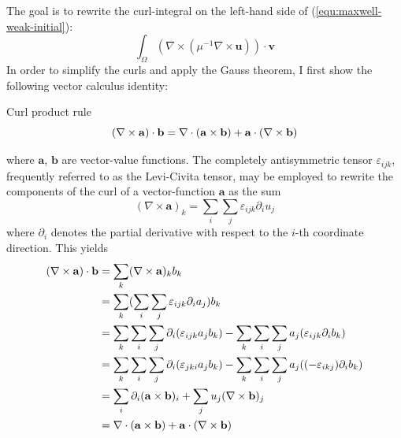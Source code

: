 \documentclass[11pt, a4paper]{article}
\begin{document}
The goal is to rewrite the curl-integral on the left-hand side of 
(\ref{equ:maxwell-weak-initial}):
\begin{equation}
    \int_{\Omega} (\nabla \times (\mu^{-1} \nabla \times \mathbf{u})) \cdot \mathbf{v} \label{equ:maxwell-weak-initial-LHS}
\end{equation}
In order to simplify the curls and apply the Gauss theorem, I first show
the following vector calculus identity:
\begin{fancybox}{Curl product rule}
    \begin{equation}
        (\nabla \times \mathbf{a}) \cdot \mathbf{b} = \nabla \cdot (\mathbf{a} \times \mathbf{b}) + \mathbf{a} \cdot (\nabla \times \mathbf{b}) \label{equ:vector-calculus} \\
    \end{equation}
\end{fancybox}
where $\mathbf{a}$, $\mathbf{b}$ are vector-value functions. The completely
antisymmetric tensor $\varepsilon_{ijk}$, frequently referred to as the
Levi-Civita tensor, may be employed to rewrite the components of the
curl of a vector-function $\mathbf{a}$ as the sum
\begin{equation}
    (\nabla \times \mathbf{a})_k = \sum_i \sum_j \varepsilon_{ijk} \partial_i u_j
\end{equation}
where $\partial_i$ denotes the partial derivative with respect to the $i$-th coordinate
direction. This yields
\begin{align}
    (\nabla \times \mathbf{a}) \cdot \mathbf{b} &= \sum_k (\nabla \times \mathbf{a})_k b_k \notag \\ 
    &= \sum_k (\sum_i \sum_j \varepsilon_{ijk} \partial_i a_j) b_k \notag \\ 
    &= \sum_k \sum_i \sum_j \partial_i (\varepsilon_{ijk} a_j b_k) - \sum_k \sum_i \sum_j a_j (\varepsilon_{ijk} \partial_i b_k) \notag \\ 
    &= \sum_k \sum_i \sum_j \partial_i (\varepsilon_{jki} a_j b_k) - \sum_k \sum_i \sum_j a_j ((-\varepsilon_{ikj}) \partial_i b_k) \notag \\ 
    &= \sum_i \partial_i (\mathbf{a} \times \mathbf{b})_i + \sum_j u_j (\nabla \times \mathbf{b})_j \notag \\ 
    &= \nabla \cdot (\mathbf{a} \times \mathbf{b}) + \mathbf{a} \cdot (\nabla \times \mathbf{b}) \label{equ:curlidentity} 
\end{align}
\end{document}
